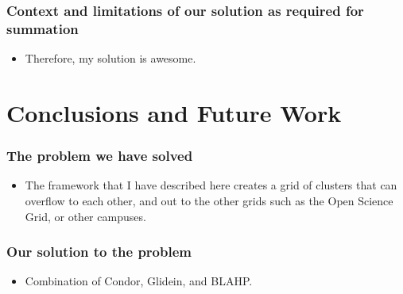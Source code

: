 \documentclass[11pt]{article}
\begin{document}
\subsubsection*{Context and limitations of our solution as required for 
summation}
\begin{itemize}
\item
Therefore, my solution is awesome.

\end{itemize}



\section{Conclusions and Future Work}
\label{sec:Conclusion}

\subsubsection*{The problem we have solved}
\begin{itemize}


\item
The framework that I have described here creates a grid of clusters that can overflow to each other, and out to the other grids such as the Open Science Grid, or other campuses.  

\end{itemize}



\subsubsection*{Our solution to the problem}
\begin{itemize}



\item
Combination of Condor, Glidein, and BLAHP.

\end{itemize}
\end{document}
